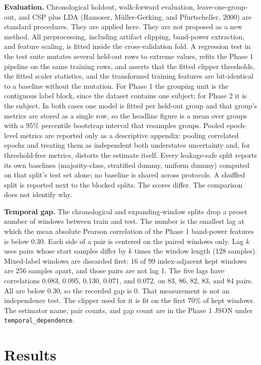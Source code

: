 \documentclass[11pt]{article}
\begin{document}
\textbf{Evaluation.} Chronological holdout, walk-forward evaluation, leave-one-group-out, and CSP plus LDA (Ramoser, M\"uller-Gerking, and Pfurtscheller, 2000) are standard procedures. They are applied here. They are not proposed as a new method. All preprocessing, including artifact clipping, band-power extraction, and feature scaling, is fitted inside the cross-validation fold. A regression test in the test suite mutates several held-out rows to extreme values, refits the Phase 1 pipeline on the same training rows, and asserts that the fitted clipper thresholds, the fitted scaler statistics, and the transformed training features are bit-identical to a baseline without the mutation. For Phase 1 the grouping unit is the contiguous label block, since the dataset contains one subject; for Phase 2 it is the subject. In both cases one model is fitted per held-out group and that group's metrics are stored as a single row, so the headline figure is a mean over groups with a 95\% percentile bootstrap interval that resamples groups. Pooled epoch-level metrics are reported only as a descriptive appendix: pooling correlated epochs and treating them as independent both understates uncertainty and, for threshold-free metrics, distorts the estimate itself. Every leakage-safe split reports its own baselines (majority-class, stratified dummy, uniform dummy) computed on that split's test set alone; no baseline is shared across protocols. A shuffled split is reported next to the blocked splits. The scores differ. The comparison does not identify why.

\textbf{Temporal gap.} The chronological and expanding-window splits drop a preset number of windows between train and test. The number is the smallest lag at which the mean absolute Pearson correlation of the Phase 1 band-power features is below 0.30. Each side of a pair is centered on the paired windows only. Lag \(k\) uses pairs whose start samples differ by \(k\) times the window length (128 samples). Mixed-label windows are discarded first: 16 of 99 index-adjacent kept windows are 256 samples apart, and those pairs are not lag 1. The five lags have correlations 0.083, 0.095, 0.130, 0.071, and 0.072, on 83, 86, 82, 83, and 84 pairs. All are below 0.30, so the recorded gap is 0. That measurement is not an independence test. The clipper used for it is fit on the first 70\% of kept windows. The estimator name, pair counts, and gap count are in the Phase 1 JSON under \texttt{temporal\_dependence}.

\section{Results}
\end{document}
